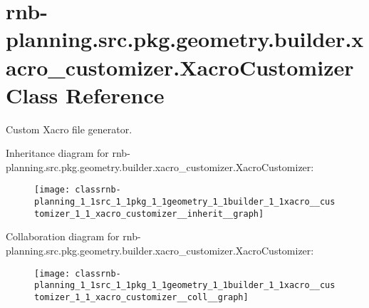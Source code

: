 \hypertarget{classrnb-planning_1_1src_1_1pkg_1_1geometry_1_1builder_1_1xacro__customizer_1_1_xacro_customizer}{}\section{rnb-\/planning.src.\+pkg.\+geometry.\+builder.\+xacro\+\_\+customizer.\+Xacro\+Customizer Class Reference}
\label{classrnb-planning_1_1src_1_1pkg_1_1geometry_1_1builder_1_1xacro__customizer_1_1_xacro_customizer}


Custom Xacro file generator.  




Inheritance diagram for rnb-\/planning.src.\+pkg.\+geometry.\+builder.\+xacro\+\_\+customizer.\+Xacro\+Customizer\+:\nopagebreak
\begin{figure}[H]
\begin{center}
\leavevmode
\texttt{[image: classrnb-planning\_1\_1src\_1\_1pkg\_1\_1geometry\_1\_1builder\_1\_1xacro\_\_customizer\_1\_1\_xacro\_customizer\_\_inherit\_\_graph]}
\end{center}
\end{figure}


Collaboration diagram for rnb-\/planning.src.\+pkg.\+geometry.\+builder.\+xacro\+\_\+customizer.\+Xacro\+Customizer\+:\nopagebreak
\begin{figure}[H]
\begin{center}
\leavevmode
\texttt{[image: classrnb-planning\_1\_1src\_1\_1pkg\_1\_1geometry\_1\_1builder\_1\_1xacro\_\_customizer\_1\_1\_xacro\_customizer\_\_coll\_\_graph]}
\end{center}
\end{figure}
